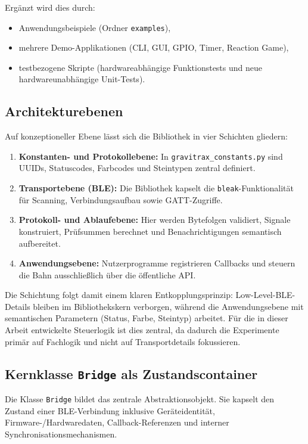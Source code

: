 Ergänzt wird dies durch:
\begin{itemize}
	\item Anwendungsbeispiele (Ordner \texttt{examples}),
	\item mehrere Demo-Applikationen (CLI, GUI, GPIO, Timer, Reaction Game),
	\item testbezogene Skripte (hardwareabhängige Funktionstests und neue hardwareunabhängige Unit-Tests).
\end{itemize}

\subsection{Architekturebenen}
Auf konzeptioneller Ebene lässt sich die Bibliothek in vier Schichten gliedern:
\begin{enumerate}
	\item \textbf{Konstanten- und Protokollebene:} In \texttt{gravitrax\_constants.py} sind UUIDs, Statuscodes, Farbcodes und Steintypen zentral definiert.
	\item \textbf{Transportebene (BLE):} Die Bibliothek kapselt die \texttt{bleak}-Funktionalität für Scanning, Verbindungsaufbau sowie GATT-Zugriffe.
	\item \textbf{Protokoll- und Ablaufebene:} Hier werden Bytefolgen validiert, Signale konstruiert, Prüfsummen berechnet und Benachrichtigungen semantisch aufbereitet.
	\item \textbf{Anwendungsebene:} Nutzerprogramme registrieren Callbacks und steuern die Bahn ausschließlich über die öffentliche API.
\end{enumerate}

Die Schichtung folgt damit einem klaren Entkopplungsprinzip: Low-Level-BLE-Details bleiben im Bibliothekskern verborgen, während die Anwendungsebene mit semantischen Parametern (Status, Farbe, Steintyp) arbeitet.
Für die in dieser Arbeit entwickelte Steuerlogik ist dies zentral, da dadurch die Experimente primär auf Fachlogik und nicht auf Transportdetails fokussieren.

\subsection{Kernklasse \texttt{Bridge} als Zustandscontainer}
Die Klasse \texttt{Bridge} bildet das zentrale Abstraktionsobjekt.
Sie kapselt den Zustand einer BLE-Verbindung inklusive Geräteidentität, Firmware-/Hardwaredaten, Callback-Referenzen und interner Synchronisationsmechanismen.

